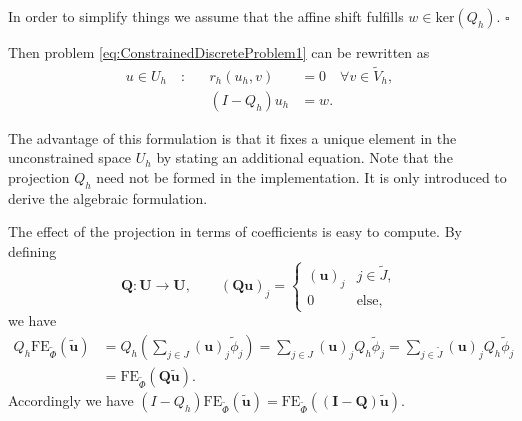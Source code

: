 \begin{Ass} In order to simplify things we assume that the affine shift
  fulfills $w\in\text{ker}(Q_h)$.
\hfill$\square$
\end{Ass}

Then problem \eqref{eq:ConstrainedDiscreteProblem1} can be rewritten
as
\begin{subequations}\label{eq:ConstrainedDiscreteProblem2}
\begin{align}
u\in U_h \quad : && r_h( u_h , v ) &= 0 \quad \forall v \in
\tilde{V}_h, \\
&& (I-Q_h) u_h &= w .
\end{align}
\end{subequations}

The advantage of this formulation is that it fixes a unique element in
the unconstrained space $U_h$ by stating an additional equation.
Note that the projection $Q_h$ need not be formed in the
implementation. It is only introduced to derive the algebraic
formulation. 

The effect of the projection in terms of coefficients is easy to
compute. By defining 
\begin{equation*}
\mathbf{Q} : \mathbf{U} \to \mathbf{U}, \qquad
(\mathbf{Q}\mathbf{u})_j = \left\{\begin{array}{ll}
(\mathbf{u})_j & j\in \tilde{J},\\
0 & \text{else},
\end{array}\right.
\end{equation*}
we have
\begin{align*}
Q_h \text{FE}_{\tilde\Phi}(\tilde{\mathbf{u}}) &=
Q_h \left(\sum_{j\in J} (\mathbf{u})_j \tilde\phi_j \right) = 
\sum_{j\in J} (\mathbf{u})_j Q_h \tilde\phi_j = 
\sum_{j\in \tilde{J}} (\mathbf{u})_j Q_h \tilde\phi_j \\
&= \text{FE}_{\tilde\Phi}(\mathbf{Q} \tilde{\mathbf{u}}).
\end{align*}
Accordingly we have $(I-Q_h)
\text{FE}_{\tilde\Phi}(\tilde{\mathbf{u}}) = 
\text{FE}_{\tilde\Phi}((\mathbf{I}-\mathbf{Q})\tilde{\mathbf{u}})$.

